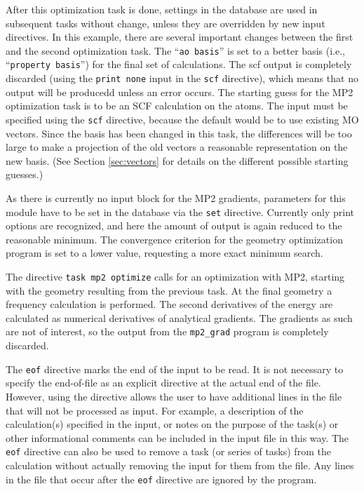 After this optimization task is done, settings in the database are used
in subsequent tasks without change, unless they are overridden by new 
input directives.
In this example, there are several important changes between the first
and the second optimization task.  The ``{\tt ao basis}'' is set to a 
better basis (i.e., ``{\tt property basis}'') for the final set of 
calculations.  The scf output is completely 
discarded (using the {\tt print  none} input in the {\tt scf} directive),
which means that no output will be producedd unless an error occurs.
The starting guess for the MP2 optimization task is to be an SCF calculation 
on the atoms. The input must be specified using the {\tt scf} directive,
because the default would be to use existing MO vectors.  Since the basis 
has been changed in this task,
the differences will be too large to make a projection of the old vectors 
a reasonable representation on the new basis.  (See Section \ref{sec:vectors}
for details on the different possible starting guesses.)

As there is currently no input block for the MP2 gradients, parameters
for this module have to be set in the database via the {\tt set}
directive. Currently only print options are recognized, and here the
amount of output is again reduced to the reasonable minimum. The
convergence criterion for the geometry optimization program is set to
a lower value, requesting a more exact minimum search.

The directive {\tt task mp2 optimize} calls for an optimization with MP2, 
starting with the geometry resulting from the previous task.  At the final 
geometry a frequency calculation is performed. The second
derivatives of the energy are calculated as numerical derivatives of
analytical gradients. The gradients as such are not of interest, so
the output from the {\tt mp2\_grad} program is completely discarded.

The {\tt eof} directive marks the end of the input to be read. It is not
necessary to specify the end-of-file as an explicit directive at the
actual end of the file.  However, using the directive allows the user to
have additional lines in the file that will not be processed as input.  For
example, a description of the calculation(s) specified in the input, or
notes on the purpose of the task(s) or other informational comments can be
included in the input file in this way.  The {\tt eof} directive can also
be used to remove a task (or series of tasks) from the calculation without
actually removing the input for them from the file.  Any lines in the file
that occur after the {\tt eof} directive are ignored by
the program.



